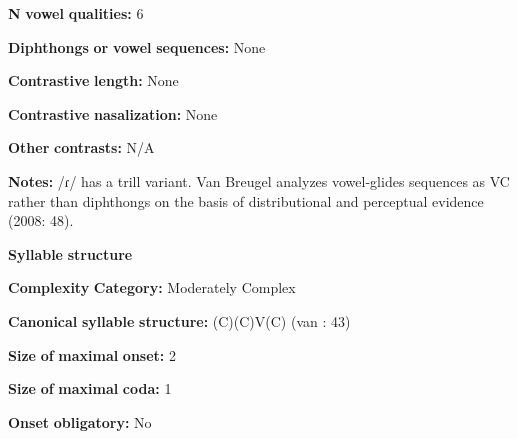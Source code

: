 \begin{styleBody}
\textbf{N} \textbf{vowel} \textbf{qualities:} 6
\end{styleBody}

\begin{styleBody}
\textbf{Diphthongs} \textbf{or} \textbf{vowel} \textbf{sequences:} None
\end{styleBody}

\begin{styleBody}
\textbf{Contrastive} \textbf{length:} None
\end{styleBody}

\begin{styleBody}
\textbf{Contrastive} \textbf{nasalization:} None
\end{styleBody}

\begin{styleBody}
\textbf{Other} \textbf{contrasts:} N/A
\end{styleBody}

\begin{styleBody}
\textbf{Notes:} /ɾ/ has a trill variant. Van Breugel analyzes vowel-glides sequences as VC rather than diphthongs on the basis of distributional and perceptual evidence (2008: 48).
\end{styleBody}

\begin{styleBody}
\textbf{Syllable} \textbf{structure}
\end{styleBody}

\begin{styleBody}
\textbf{Complexity} \textbf{Category:} Moderately Complex
\end{styleBody}

\begin{styleBody}
\textbf{Canonical} \textbf{syllable} \textbf{structure:} (C)(C)V(C) (van \citealt{Breugel2008}: 43)
\end{styleBody}

\begin{styleBody}
\textbf{Size} \textbf{of} \textbf{maximal} \textbf{onset:} 2
\end{styleBody}

\begin{styleBody}
\textbf{Size} \textbf{of} \textbf{maximal} \textbf{coda:} 1
\end{styleBody}

\begin{styleBody}
\textbf{Onset} \textbf{obligatory:} No
\end{styleBody}


